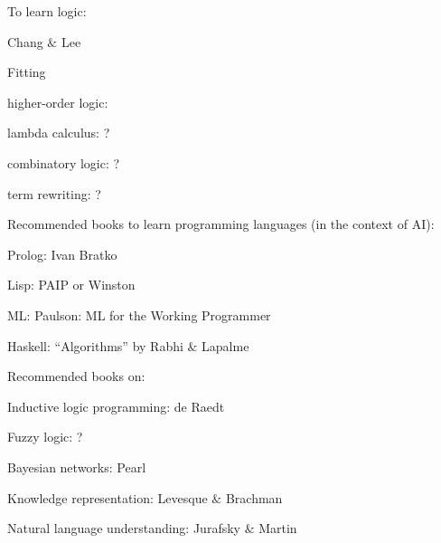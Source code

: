 To learn logic:
\begin{compactenum-}[\textbullet ]
\item Chang $\&$ Lee
\item Fitting
\item higher-order logic:
\item lambda calculus: ?
\item combinatory logic: ?
\item term rewriting: ?
\end{compactenum-}

Recommended books to learn programming languages (in the context of AI):
\begin{compactenum-}[\textbullet ]
\item Prolog: Ivan Bratko
\item Lisp: PAIP or Winston
\item ML: Paulson: ML for the Working Programmer
\item Haskell: ``Algorithms'' by Rabhi $\&$ Lapalme
\end{compactenum-}

Recommended books on:
\begin{compactenum-}[\textbullet ]
\item Inductive logic programming: de Raedt
\item Fuzzy logic: ?
\item Bayesian networks: Pearl
\item Knowledge representation: Levesque $\&$ Brachman
\item Natural language understanding: Jurafsky $\&$ Martin
\end{compactenum-}
